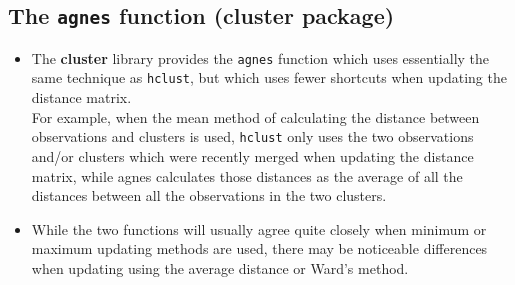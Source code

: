 \documentclass[SKLCluster.tex]{subfiles}
\begin{document}
\subsection{The \texttt{agnes} function (cluster package)}
\begin{itemize}
\item The \textbf{cluster} library provides the \texttt{agnes} function which uses essentially the same technique as \texttt{hclust}, but which uses fewer shortcuts when updating the distance matrix.\\ For example, when the mean method of calculating the distance between observations and clusters is used, \texttt{hclust} only uses the two observations and/or clusters which were recently merged when updating the distance matrix, while agnes calculates those distances as the average of all the distances between all the observations in the two clusters. 

\item While the two functions will usually agree quite closely when minimum or maximum updating methods are used, there may be noticeable differences when updating using the average distance or Ward's method.
\end{itemize}
\newpage

\newpage
\end{document}

